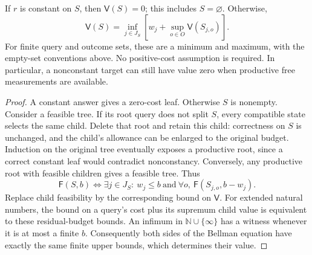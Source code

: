 \begin{theorem}\label{thm:repair-bellman}
If $r$ is constant on $S$, then $\mathsf V(S)=0$; this includes
$S=\varnothing$. Otherwise,
\[
 \mathsf V(S)=\inf_{j\in J_S}
   \left[w_j+\sup_{o\in O}\mathsf V(S_{j,o})\right].
\]
For finite query and outcome sets, these are a minimum and maximum,
with the empty-set conventions above. No positive-cost assumption is
required. In particular, a nonconstant target can still have value zero
when productive free measurements are available.
\end{theorem}
\begin{proof}
A constant answer gives a zero-cost leaf. Otherwise $S$ is nonempty.
Consider a feasible tree. If its root query does not split $S$, every
compatible state selects the same child. Delete that root and retain
this child: correctness on $S$ is unchanged, and the child's allowance
can be enlarged to the original budget. Induction on the original tree
eventually exposes a productive root, since a correct constant leaf
would contradict nonconstancy. Conversely, any productive root with
feasible children gives a feasible tree. Thus
\[
 \mathsf F(S,b)\iff
 \exists j\in J_S:\ w_j\le b\ \text{and}\
   \forall o,\ \mathsf F(S_{j,o},b-w_j).
\]
Replace child feasibility by the corresponding bound on $\mathsf V$.
For extended natural numbers, the bound on a query's cost plus its
supremum child value is equivalent to these residual-budget bounds.
An infimum in $\mathbb N\cup\{\infty\}$ has a witness whenever it is
at most a finite $b$. Consequently both sides of the Bellman equation
have exactly the same finite upper bounds, which determines their value.
\end{proof}

